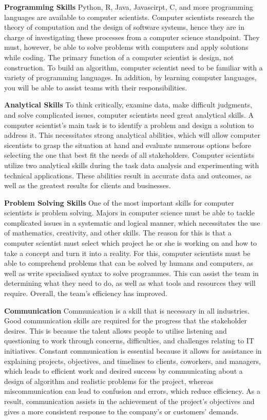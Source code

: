 \documentclass[a4paper, 11pt]{report}
\begin{document}
\textbf{Programming Skills}
  Python, R, Java, Javascirpt, C, and more programming languages are available to computer scientists. Computer scientists research the theory of computation and the design of software systems, hence they are in charge of investigating these processes from a computer science standpoint. They must, however, be able to solve problems with computers and apply solutions while coding. The primary function of a computer scientist is design, not construction. To build an algorithm, computer scientist need to be familiar with a variety of programming languages. In addition, by learning computer languages, you will be able to assist teams with their responsibilities.

\textbf{Analytical Skills}
  To think critically, examine data, make difficult judgments, and solve complicated issues, computer scientists need great analytical skills. A computer scientist's main task is to identify a problem and design a solution to address it. This necessitates strong analytical abilities, which will allow computer sicentists to grasp the situation at hand and evaluate numerous options before selecting the one that best fit the needs of all stakeholders. Computer scientists utilize two analytical skills during the task data analysis and experimenting with technical applications. These abilities result in accurate data and outcomes, as well as the greatest results for clients and businesses.

\textbf{Problem Solving Skills}
  One of the most important skills for computer scientists is problem solving. Majors in computer science must be able to tackle complicated issues in a systematic and logical manner, which necessitates the use of mathematics, creativity, and other skills. The reason for this is that a computer scientist must select which project he or she is working on and how to take a concept and turn it into a reality. For this, computer scientists must be able to comprehend problems that can be solved by humans and computers, as well as write specialised syntax to solve programmes. This can assist the team in determining what they need to do, as well as what tools and resources they will require. Overall, the team's efficiency has improved.

\textbf{Communication}
  Communication is a skill that is necessary in all industries. Good communication skills are required for the progress that the stakeholder desires. This is because the talent allows people to utilise listening and questioning to work through concerns, difficulties, and challenges relating to IT initiatives. Constant communication is essential because it allows for assistance in explaining projects, objectives, and timelines to clients, coworkers, and managers, which leads to efficient work and desired success by communicating about a design of algorithm and realistic problems for the project, whereas miscommunication can lead to confusion and errors, which reduce efficiency. As a result, communication assists in the achievement of the project's objectives and gives a more consistent response to the company's or customers' demands.
\end{document}

